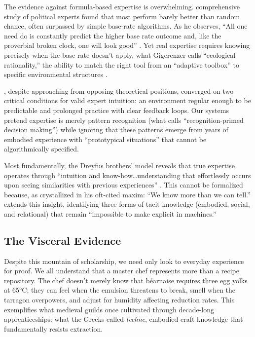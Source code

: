 The evidence against formula-based expertise is overwhelming. \citet{tetlock2005} comprehensive study of political experts found that most perform barely better than random chance, often surpassed by simple base-rate algorithms. As he observes, ``All one need do is constantly predict the higher base rate outcome and, like the proverbial broken clock, one will look good'' \citep{tetlock2005}. Yet real expertise requires knowing precisely when the base rate doesn't apply, what Gigerenzer calls ``ecological rationality,'' the ability to match the right tool from an ``adaptive toolbox'' to specific environmental structures \citep{gigerenzer2001}.

\citet{kahneman2009}, despite approaching from opposing theoretical positions, converged on two critical conditions for valid expert intuition: an environment regular enough to be predictable and prolonged practice with clear feedback loops. Our systems pretend expertise is merely pattern recognition (what \citet{klein1993} calls ``recognition-primed decision making'') while ignoring that these patterns emerge from years of embodied experience with ``prototypical situations'' that cannot be algorithmically specified.

Most fundamentally, the Dreyfus brothers' model reveals that true expertise operates through ``intuition and know-how\ldots understanding that effortlessly occurs upon seeing similarities with previous experiences'' \citep{pena2010}. This cannot be formalized because, as \citet{polanyi1966} crystallized in his oft-cited maxim: ``We know more than we can tell.'' \citet{collins2010} extends this insight, identifying three forms of tacit knowledge (embodied, social, and relational) that remain ``impossible to make explicit in machines.''

\subsection{The Visceral Evidence}

Despite this mountain of scholarship, we need only look to everyday experience for proof. We all understand that a master chef represents more than a recipe repository. The chef doesn't merely know that béarnaise requires three egg yolks at 65°C; they can feel when the emulsion threatens to break, smell when the tarragon overpowers, and adjust for humidity affecting reduction rates. This exemplifies what medieval guilds once cultivated through decade-long apprenticeships: what the Greeks called \emph{techne}, embodied craft knowledge that fundamentally resists extraction.

